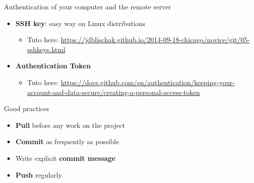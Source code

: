 \documentclass[10pt]{beamer}
\begin{document}
\begin{frame}{Authentication of your computer and the remote server}
    \begin{itemize}
        \item \textbf{SSH key}: easy way on Linux distributions
        \begin{itemize}
            \item Tuto here: \url{https://jdblischak.github.io/2014-09-18-chicago/novice/git/05-sshkeys.html}
        \end{itemize}
        \vspace{0.2cm}
        \item \textbf{Authentication Token}
            \begin{itemize}
            \item Tuto here:  \url{https://docs.github.com/en/authentication/keeping-your-account-and-data-secure/creating-a-personal-access-token}
        \end{itemize}
    \end{itemize}
\end{frame}

\begin{frame}{Good practices}
    \begin{itemize}
        \item \textbf{Pull} before any work on the project
        \vspace{0.2cm}
        \item \textbf{Commit} as frequently as possible
        \vspace{0.2cm}
        \item Write explicit \textbf{commit message}
        \vspace{0.2cm}
        \item \textbf{Push} regularly

    \end{itemize}
\end{frame}
\end{document}
